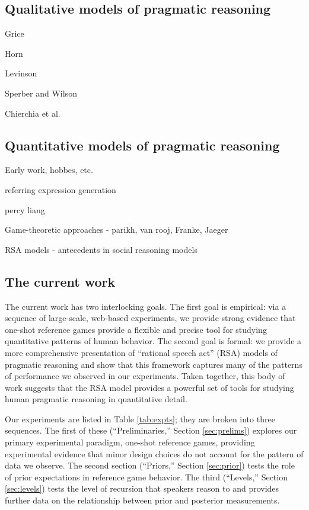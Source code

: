\subsection{Qualitative models of pragmatic reasoning}

Grice

Horn

Levinson

Sperber and Wilson

Chierchia et al. 

\subsection{Quantitative models of pragmatic reasoning}

Early work, hobbes, etc. 

referring expression generation

percy liang

Game-theoretic approaches - parikh, van rooj, Franke, Jaeger

RSA models - antecedents in social reasoning models \cite{baker2009}

\subsection{The current work}

The current work has two interlocking goals. The first goal is empirical: via a sequence of large-scale, web-based experiments, we provide strong evidence that one-shot reference games provide a flexible and precise tool for studying quantitative patterns of human behavior. The second goal is formal: we provide a more comprehensive presentation of ``rational speech act'' (RSA) models of pragmatic reasoning and show that this framework captures many of the patterns of performance we observed in our experiments. Taken together, this body of work suggests that the RSA model provides a powerful set of tools for studying human pragmatic reasoning in quantitative detail. 

Our experiments are listed in Table \ref{tab:expts}; they are broken into three sequences. The first of these (``Preliminaries,'' Section \ref{sec:prelims}) explores our primary experimental paradigm, one-shot reference games, providing experimental evidence that minor design choices do not account for the pattern of data we observe. The second section (``Priors,'' Section \ref{sec:prior}) tests the role of prior expectations in reference game behavior. The third (``Levels,'' Section \ref{sec:levels}) tests the level of recursion that speakers reason to and provides further data on the relationship between prior and posterior measurements. 

